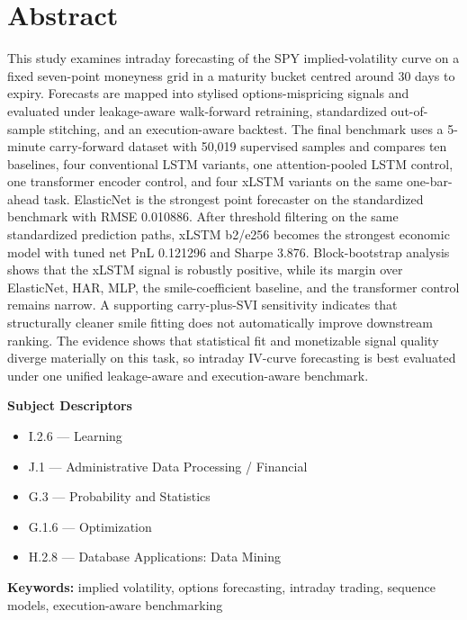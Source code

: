 \documentclass[12pt]{report}
\begin{document}
\cleardoublepage
\setcounter{page}{1}

\chapter*{Abstract}
This study examines intraday forecasting of the SPY implied-volatility curve on a fixed seven-point moneyness grid in a maturity bucket centred around 30 days to expiry. Forecasts are mapped into stylised options-mispricing signals and evaluated under leakage-aware walk-forward retraining, standardized out-of-sample stitching, and an execution-aware backtest. The final benchmark uses a 5-minute carry-forward dataset with 50,019 supervised samples and compares ten baselines, four conventional LSTM variants, one attention-pooled LSTM control, one transformer encoder control, and four xLSTM variants on the same one-bar-ahead task. ElasticNet is the strongest point forecaster on the standardized benchmark with RMSE 0.010886. After threshold filtering on the same standardized prediction paths, xLSTM b2/e256 becomes the strongest economic model with tuned net PnL 0.121296 and Sharpe 3.876. Block-bootstrap analysis shows that the xLSTM signal is robustly positive, while its margin over ElasticNet, HAR, MLP, the smile-coefficient baseline, and the transformer control remains narrow. A supporting carry-plus-SVI sensitivity indicates that structurally cleaner smile fitting does not automatically improve downstream ranking. The evidence shows that statistical fit and monetizable signal quality diverge materially on this task, so intraday IV-curve forecasting is best evaluated under one unified leakage-aware and execution-aware benchmark.

\vspace{0.8em}
\noindent\textbf{Subject Descriptors}
\begin{itemize}[leftmargin=1.8cm,itemsep=0.2em,topsep=0.2em]
    \item I.2.6 --- Learning
    \item J.1 --- Administrative Data Processing / Financial
    \item G.3 --- Probability and Statistics
    \item G.1.6 --- Optimization
    \item H.2.8 --- Database Applications: Data Mining
\end{itemize}

\noindent\textbf{Keywords:} implied volatility, options forecasting, intraday trading, sequence models, execution-aware benchmarking
\end{document}

